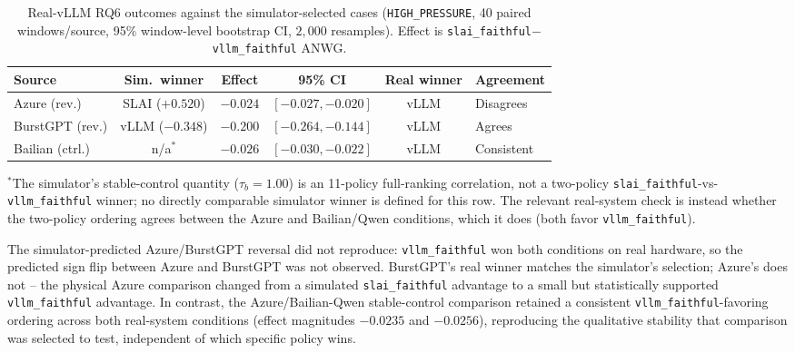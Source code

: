 \begin{table}[t]
\centering
\caption{Real-vLLM RQ6 outcomes against the simulator-selected cases (\texttt{HIGH\_PRESSURE}, 40 paired windows/source, 95\% window-level bootstrap CI, $2{,}000$ resamples). Effect is \texttt{slai\_faithful}$-$\texttt{vllm\_faithful} ANWG.}
\label{tab:rq6-results}
\small
\setlength{\tabcolsep}{4.5pt}
\begin{tabular}{lccccl}
\toprule
Source & Sim.\ winner & Effect & 95\% CI & Real winner & Agreement \\
\midrule
Azure (rev.) & SLAI ($+0.520$) & $-0.024$ & $[-0.027,-0.020]$ & vLLM & Disagrees \\
BurstGPT (rev.) & vLLM ($-0.348$) & $-0.200$ & $[-0.264,-0.144]$ & vLLM & Agrees \\
Bailian (ctrl.) & n/a$^{*}$ & $-0.026$ & $[-0.030,-0.022]$ & vLLM & Consistent \\
\bottomrule
\end{tabular}
\vspace{2pt}

{\footnotesize $^{*}$The simulator's stable-control quantity ($\tau_b = 1.00$) is an
11-policy full-ranking correlation, not a two-policy \texttt{slai\_faithful}-vs-\texttt{vllm\_faithful}
winner; no directly comparable simulator winner is defined for this row. The
relevant real-system check is instead whether the two-policy ordering agrees
between the Azure and Bailian/Qwen conditions, which it does (both favor
\texttt{vllm\_faithful}).}
\end{table}

The simulator-predicted Azure/BurstGPT reversal did not reproduce: \texttt{vllm\_faithful} won both conditions on real hardware, so the predicted sign flip between Azure and BurstGPT was not observed. BurstGPT's real winner matches the simulator's selection; Azure's does not -- the physical Azure comparison changed from a simulated \texttt{slai\_faithful} advantage to a small but statistically supported \texttt{vllm\_faithful} advantage. In contrast, the Azure/Bailian-Qwen stable-control comparison retained a consistent \texttt{vllm\_faithful}-favoring ordering across both real-system conditions (effect magnitudes $-0.0235$ and $-0.0256$), reproducing the qualitative stability that comparison was selected to test, independent of which specific policy wins.

